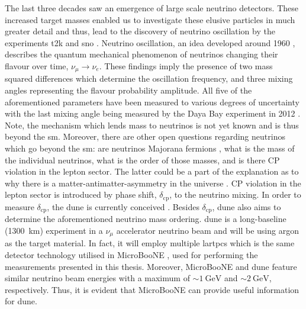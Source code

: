 The last three decades saw an emergence of large scale neutrino detectors. These increased target masses enabled us to investigate these elusive particles in much greater detail and thus, lead to the discovery of neutrino oscillation by the experiments \gls{t2k} \cite{NuOscillationDiscovery} and \gls{sno} \cite{NuMixingDiscovery}. Neutrino oscillation, an idea developed around 1960 \cite{PMNSMatrix1,PMNSMatrix2}, describes the quantum mechanical phenomenon of neutrinos changing their flavour over time, \eg $\nu_\mu \to \nu_e$. These findings imply the presence of two mass squared differences which determine the oscillation frequency, and three mixing angles representing the flavour probability amplitude. All five of the aforementioned parameters have been measured to various degrees of uncertainty with the last mixing angle being measured by the Daya Bay experiment in 2012 \cite{NuTheta13Measurement}. Note, the mechanism which lends mass to neutrinos is not yet known and is thus beyond the \gls{sm}. Moreover, there are other open questions regarding neutrinos which go beyond the \gls{sm}: are neutrinos Majorana fermions \cite{MajoranaFermions}, what is the mass of the individual neutrinos, what is the order of those masses, and is there \gls{CP} violation in the lepton sector. The latter could be a part of the explanation as to why there is a matter-antimatter-asymmetry in the universe \cite{NuCPViolation}. \Gls{CP} violation in the lepton sector is introduced by phase shift, $\delta_\text{cp}$, to the neutrino mixing. In order to measure $\delta_\text{cp}$, the \gls{dune} is currently conceived \cite{DUNE1,DUNE2,DUNE3,DUNE4}. Besides $\delta_\text{cp}$, \gls{dune} also aims to determine the aforementioned neutrino mass ordering. \Gls{dune} is a long-baseline (\SI{1300}{\kilo\metre}) experiment in a $\nu_\mu$ accelerator neutrino beam and will be using argon as the target material. In fact, it will employ multiple \glspl{lartpc} which is the same detector technology utilised in MicroBooNE \cite{MicroBooNEDetector}, used for performing the measurements presented in this thesis. Moreover, MicroBooNE and \gls{dune} feature similar neutrino beam energies with a maximum of $\sim\SI{1}{\giga\electronvolt}$ and $\sim\SI{2}{\giga\electronvolt}$, respectively. Thus, it is evident that MicroBooNE can provide useful information for \gls{dune}.

